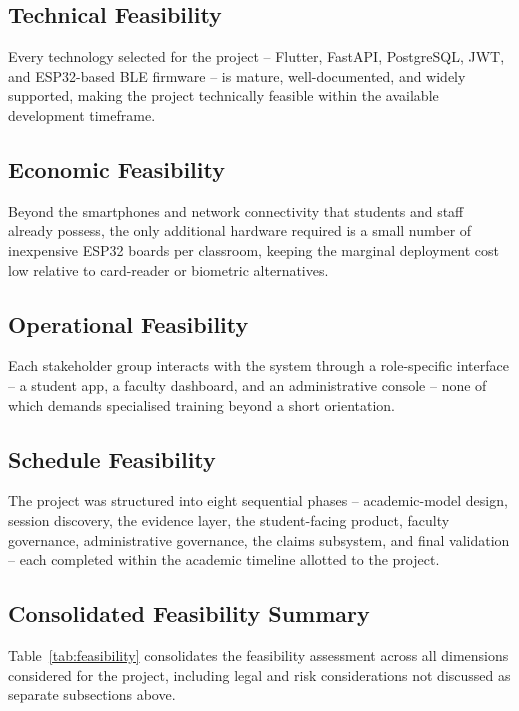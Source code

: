 \documentclass[12pt, a4paper, oneside]{report}
\begin{document}
\subsection{Technical Feasibility}
Every technology selected for the project -- Flutter, FastAPI, PostgreSQL, JWT, and ESP32-based BLE firmware -- is mature, well-documented, and widely supported, making the project technically feasible within the available development timeframe.

\subsection{Economic Feasibility}
Beyond the smartphones and network connectivity that students and staff already possess, the only additional hardware required is a small number of inexpensive ESP32 boards per classroom, keeping the marginal deployment cost low relative to card-reader or biometric alternatives.

\subsection{Operational Feasibility}
Each stakeholder group interacts with the system through a role-specific interface -- a student app, a faculty dashboard, and an administrative console -- none of which demands specialised training beyond a short orientation.

\subsection{Schedule Feasibility}
The project was structured into eight sequential phases -- academic-model design, session discovery, the evidence layer, the student-facing product, faculty governance, administrative governance, the claims subsystem, and final validation -- each completed within the academic timeline allotted to the project.

\subsection{Consolidated Feasibility Summary}
Table~\ref{tab:feasibility} consolidates the feasibility assessment across all dimensions considered for the project, including legal and risk considerations not discussed as separate subsections above.
\end{document}
